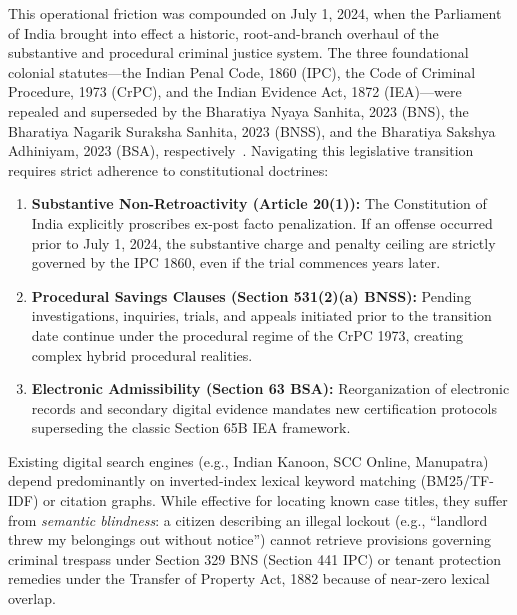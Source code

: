 \documentclass[conference]{IEEEtran}
\begin{document}
This operational friction was compounded on July 1, 2024, when the Parliament of India brought into effect a historic, root-and-branch overhaul of the substantive and procedural criminal justice system. The three foundational colonial statutes—the Indian Penal Code, 1860 (IPC), the Code of Criminal Procedure, 1973 (CrPC), and the Indian Evidence Act, 1872 (IEA)—were repealed and superseded by the Bharatiya Nyaya Sanhita, 2023 (BNS), the Bharatiya Nagarik Suraksha Sanhita, 2023 (BNSS), and the Bharatiya Sakshya Adhiniyam, 2023 (BSA), respectively~\cite{bns2023, bnss2023, bsa2023}. Navigating this legislative transition requires strict adherence to constitutional doctrines:
\begin{enumerate}
    \item \textbf{Substantive Non-Retroactivity (Article 20(1)):} The Constitution of India explicitly proscribes ex-post facto penalization. If an offense occurred prior to July 1, 2024, the substantive charge and penalty ceiling are strictly governed by the IPC 1860, even if the trial commences years later.
    \item \textbf{Procedural Savings Clauses (Section 531(2)(a) BNSS):} Pending investigations, inquiries, trials, and appeals initiated prior to the transition date continue under the procedural regime of the CrPC 1973, creating complex hybrid procedural realities.
    \item \textbf{Electronic Admissibility (Section 63 BSA):} Reorganization of electronic records and secondary digital evidence mandates new certification protocols superseding the classic Section 65B IEA framework.
\end{enumerate}

Existing digital search engines (e.g., Indian Kanoon, SCC Online, Manupatra) depend predominantly on inverted-index lexical keyword matching (BM25/TF-IDF) or citation graphs. While effective for locating known case titles, they suffer from \textit{semantic blindness}: a citizen describing an illegal lockout (e.g., ``landlord threw my belongings out without notice'') cannot retrieve provisions governing criminal trespass under Section 329 BNS (Section 441 IPC) or tenant protection remedies under the Transfer of Property Act, 1882 because of near-zero lexical overlap.
\end{document}
